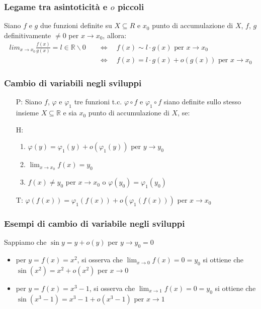 \documentclass[a4paper]{article}
\begin{document}
\subsubsection*{Legame tra asintoticità e \(o\) piccoli}
Siano \(f\) e \(g\) due funzioni definite su \(X \subseteq R\) e \(x_0\) punto di accumulazione di \(X\), \(f\), \(g\) definitivamente \(\neq 0\) per \(x \to x_0\), allora:
\begin{align*}
	lim_{x \to x_0} \frac{f(x)}{g(x)} = l \in \mathbb{R} \backslash 0 \quad &\Leftrightarrow \quad f(x) \sim l \cdot g(x) \text{ per } x \to x_0 \\
	&\Leftrightarrow \quad f(x) = l \cdot g(x) + o(g(x)) \text{ per } x \to x_0
\end{align*}

\subsubsection*{Cambio di variabili negli sviluppi}
\begin{itemize}
	\item[P:] Siano \(f\), \(\varphi\) e \(\varphi_1\) tre funzioni t.c. \(\varphi \circ f\) e \(\varphi_1 \circ f\) siano definite sullo stesso
	insieme \(X \subseteq \mathbb{R}\) e sia \(x_0\) punto di accumulazione di \(X\), se:
	\item[H:]
	\begin{enumerate}
		\item \(\varphi(y) = \varphi_1(y) + o(\varphi_1(y))\) per \(y \to y_0\)
		\item \(\displaystyle \lim_{x \to x_0} f(x) = y_0\)
		\item \(f(x) \neq y_0\) per \(x \to x_0\) o \(\varphi(y_0) = \varphi_1(y_0)\)
	\end{enumerate}
	\item[T:] \(\varphi(f(x)) = \varphi_1(f(x)) + o(\varphi_1(f(x)))\) per \(x \to x_0\)
\end{itemize}

\subsubsection*{Esempi di cambio di variabile negli sviluppi}
Sappiamo che \(\sin y = y + o(y)\) per \(y \to y_0 = 0\)
\begin{itemize}
	\item per \(y = f(x) = x^2\), si osserva che \(\displaystyle \lim_{x \to 0} f(x) = 0 = y_0\) si ottiene che \\ \(\sin(x^2) = x^2 + o(x^2)\) per \(x \to 0\)
	\item per \(y = f(x) = x^3 - 1\), si osserva che \(\displaystyle \lim_{x \to 1} f(x) = 0 = y_0\) si ottiene che \\ \(\sin(x^3 - 1) = x^3 - 1 + o(x^3 - 1)\) per \(x \to 1\)
\end{itemize}
\end{document}
